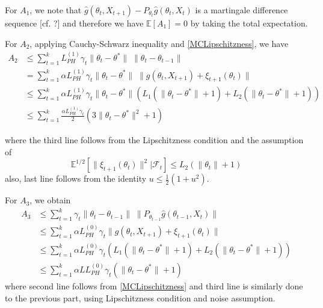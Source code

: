 \documentclass[a4paper]{article}
\newcommand{\norm}[1]{\|#1 \|}
\newcommand{\Exs}{\mathbb{E}}
\newcommand{\thetastar}{\theta^*}
\newcommand{\constLPH}[1]{L_{PH}^{(#1)}}
\newcommand{\stepsize}{\alpha}
\begin{document}
	For $A_{1}$, we note that $\hat{g}\left(\theta_{t}, X_{t + 1}\right) - P_{\theta_{t}}\hat{g}\left(\theta_{t}, X_{t}\right)$ is a martingale difference sequence [cf. ?] and therefore we have $\Exs[A_{1}] = 0$ by taking the total expectation.
	
	For $A_{2}$, applying Cauchy-Schwarz inequality and \ref{MCLipschitzness}, we have
	\begin{align*}
		A_{2} & \le \sum_{t = 1}^{k}\constLPH{1}\gamma_{t}\norm{\theta_{t} - \thetastar}\;\norm{\theta_{t} - \theta_{t - 1}}\\
		& = \sum_{t = 1}^{k}\stepsize \constLPH{1}\gamma_{t}\norm{\theta_{t} - \thetastar}\;\norm{g(\theta_{t}, X_{t + 1}) + \xi_{t +‌1}(\theta_{t})}\\
		& \le \sum_{t = 1}^{k}\stepsize\constLPH{1} \gamma_{t}\norm{\theta_{t} - \thetastar}\left( L_{1}\left(\norm{\theta_{t} - \thetastar} + 1\right) + L_{2}\left(\norm{\theta_{t} - \thetastar} + 1\right)\right)\\
		& \le \sum_{t = 1}^{k}\frac{\stepsize\constLPH{1}\gamma_{t}}{2}\left(3\norm{\theta_{t} - \thetastar}^{2} + 1\right)
	\end{align*}
	
	
	
	
	where the third line follows from the Lipschitzness condition and the assumption of
	$$\Exs^{1 / 2}\left[\norm{\xi_{t + 1}\left(\theta_{t}\right)}^{2} | \mathcal{F}_{t}\right] \le L_{2}\left(\norm{\theta_{t}} + 1\right)$$
	also, last line follows from the identity $u \le \frac{1}{2}(1 + u^{2})$.
	
	For $A_{3}$, we obtain
	\begin{align*}
		A_{3} & \le \sum_{t = 1}^{k}\gamma_{t}\norm{\theta_{t} - \theta_{t - 1}} \; \norm{P_{\theta_{t - 1}}\hat{g}\left(\theta_{t - 1}, X_{t}\right)}\\
		& \le \sum_{t = 1}^{k}\stepsize \constLPH{0}\gamma_{t}\norm{g\left(\theta_{t}, X_{t + 1}\right)‌ + \xi_{t + 1}(\theta_{t})}\\
		& \le \sum_{t = 1}^{k}\stepsize\constLPH{0}\gamma_{t}\left(L_{1}\left(\norm{\theta_{t} - \thetastar} + 1\right) + L_{2}\left(\norm{\theta_{t} - \thetastar} + 1\right)\right)\\
		& \le \sum_{t = 1}^{k}\stepsize L \constLPH{0}\gamma_{t}\left(\norm{\theta_{t} - \thetastar} + 1\right)
	\end{align*}
	where second line follows from \ref{MCLipschitzness} and third line is similarly done to the previous part, using Lipschitzness condition and noise assumption.
	
\end{document}
